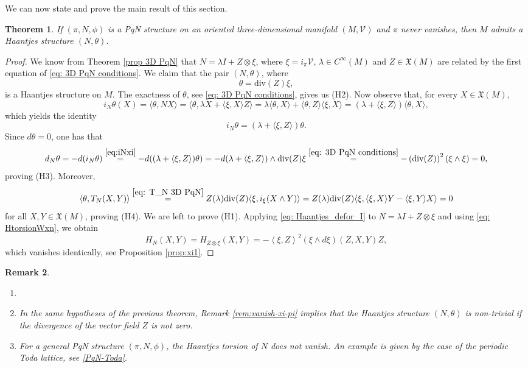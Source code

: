 \documentclass[12pt]{article}
\newtheorem{theorem}{Theorem}%
\newtheorem{remark}[theorem]{Remark}
\begin{document}
We can now state and prove the main result of this section. 
\begin{theorem}
\label{theo:haan} 
If $(\pi,N,\phi)$ is a PqN structure on an oriented three-dimensional manifold $(M,\mathcal V)$ and $\pi$ never vanishes, then  $M$ admits a Haantjes structure $(N,\theta)$. 
\end{theorem}
\begin{proof} 
We know from Theorem \ref{prop 3D PqN} that 
$N=\lambda I+Z\otimes\xi$, where $\xi=i_{\pi}\mathcal{V}$, $\lambda\in C^{\infty}(M)$ and $Z\in\mathfrak X(M)$ are related by the first equation of \eqref{eq: 3D PqN conditions}. We claim that the pair $(N,\theta)$, where 
\begin{equation}\label{eq: 1-form theta}
\theta=\text{div}(Z)\xi,
\end{equation}
is a Haantjes structure on $M$. 
The exactness of $\theta$, see \eqref{eq: 3D PqN conditions}, gives us (H2). Now observe that, for every $X\in\mathfrak X(M)$,
\[
i_N\theta(X)=\langle\theta,NX\rangle=\langle\theta,\lambda X+\langle\xi,X\rangle Z\rangle=\lambda\langle\theta,X\rangle+\langle\theta,Z\rangle\langle\xi,X\rangle=(\lambda+\langle\xi,Z\rangle)\langle\theta,X\rangle,
\]
which yields the identity
\begin{equation}
i_N\theta=(\lambda+\langle\xi,Z\rangle)\theta.\label{eq:iNxi}
\end{equation}
Since $d\theta=0$, one has that
\[
d_N\theta=-d(i_N\theta)\stackrel{\eqref{eq:iNxi}}{=}-d((\lambda+\langle\xi,Z\rangle)\theta)=-d(\lambda+\langle\xi,Z\rangle)\wedge\text{div}(Z)\xi\stackrel{\eqref{eq: 3D PqN conditions}}{=}-\left(\text{div}(Z)\right)^2(\xi\wedge\xi)=0,
\]
proving (H3). Moreover, 
\[
\langle\theta,T_N(X,Y)\rangle\stackrel{\eqref{eq: T_N 3D PqN}}{=}Z(\lambda)\text{div}(Z)\langle\xi,i_\xi(X\wedge Y)\rangle=Z(\lambda)\text{div}(Z)\langle\xi,\langle\xi,X\rangle Y-\langle\xi,Y\rangle X\rangle=0
\]
for all $X,Y\in\mathfrak X(M)$, proving (H4). We are left to prove (H1). 
Applying \eqref{eq: Haantjes_defor_I} to $N=\lambda I+Z\otimes\xi$ and using \eqref{eq: HtorsionWxn}, we obtain
\[
H_N(X,Y)=H_{Z\otimes\xi}(X,Y)=-\left<\xi,Z\right>^2\left(\xi\wedge d\xi\right)(Z,X,Y)Z,
\]
which vanishes identically, see Proposition \ref{prop:xi1}.
\end{proof}

\begin{remark}
\begin{enumerate}
\item[]
\item In the same hypotheses of the previous theorem, Remark \ref{rem:vanish-xi-pi} implies that 
the Haantjes structure $(N,\theta)$ is non-trivial if the divergence of the vector field $Z$ is not zero.
\item For a general PqN structure $(\pi,N,\phi)$, the Haantjes torsion of $N$ does not vanish. An example is given by the case of the periodic Toda lattice, see \eqref{PqN-Toda}.
\end{enumerate}
\end{remark}
\end{document}
